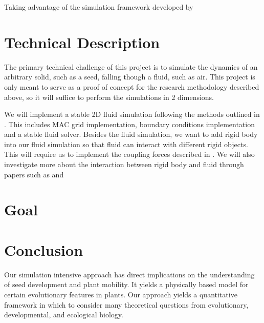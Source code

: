 \documentclass[annual]{acmsiggraph}
\begin{document}
 






Taking advantage of the simulation framework developed by 



\section{Technical Description}
The primary technical challenge of this project is to simulate the dynamics of an arbitrary solid, such as a seed, falling though a fluid, such as air.  This project is only meant to serve as a proof of concept for the research methodology described above, so it will suffice to perform the simulations in 2 dimensions.   

We will implement a stable 2D fluid simulation following the methods outlined in \cite{bridson2006}. This includes MAC grid implementation, boundary conditions implementation and a stable fluid solver. Besides the fluid simulation, we want to add rigid body into our fluid simulation so that fluid can interact with different rigid objects. This will require us to implement the coupling forces described in \cite{carlson2004}. We will also investigate more about the interaction between rigid body and fluid through papers such as \cite{guendelman2005} and \cite{baxter2004}



\section{Goal}

\section{Conclusion}

Our simulation intensive approach has direct implications on the understanding of seed development and plant mobility.  It yields a physically based model for certain evolutionary features in plants.   Our approach yields a quantitative framework in which to consider many theoretical questions from evolutionary, developmental, and ecological biology.  




\end{document}
